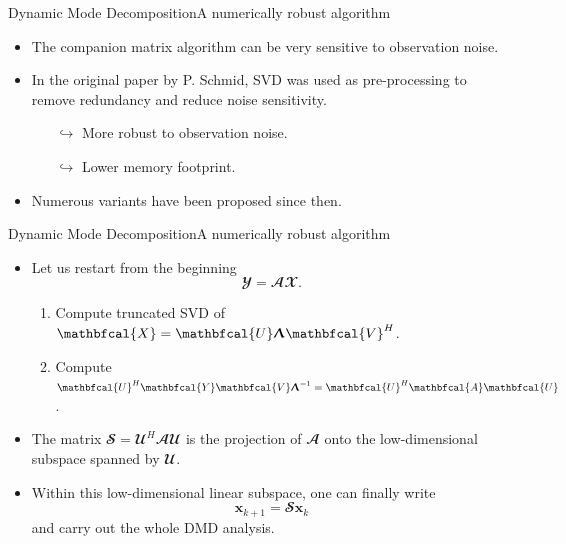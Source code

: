 \documentclass[usenames,dvipsnames,svgnames,10pt,aspectratio=169]{beamer}
\begin{document}
\begin{frame}[t, c]{Dynamic Mode Decomposition}{A numerically robust algorithm}
	\begin{itemize}
		\item The companion matrix algorithm can be very sensitive to observation noise.

		\bigskip

		\item In the original paper by P. Schmid, SVD was used as pre-processing to remove redundancy and reduce noise sensitivity.
		\begin{itemize}
			\item[$\hookrightarrow$] More robust to observation noise.
			\item[$\hookrightarrow$] Lower memory footprint.
		\end{itemize}

		\bigskip

		\item Numerous variants have been proposed since then.
	\end{itemize}

	\vspace{1cm}
\end{frame}

\begin{frame}[t, c]{Dynamic Mode Decomposition}{A numerically robust algorithm}
	\begin{itemize}
		\item Let us restart from the beginning
			$$\mathbfcal{Y} = \mathbfcal{A} \mathbfcal{X}.$$
			\begin{enumerate}
				\item Compute truncated SVD of $\mathbfcal{X} = \mathbfcal{U} \boldsymbol{\Uplambda} \mathbfcal{V}^H$.
				\item Compute $\mathbfcal{U}^H \mathbfcal{Y} \mathbfcal{V} \boldsymbol{\Uplambda}^{-1} = \mathbfcal{U}^H \mathbfcal{A} \mathbfcal{U}$.
			\end{enumerate}

			\bigskip

			\item The matrix $\mathbfcal{S} = \mathbfcal{U}^H \mathbfcal{A} \mathbfcal{U}$ is the projection of $\mathbfcal{A}$ onto the low-dimensional subspace spanned by $\mathbfcal{U}$.

			\bigskip

			\item Within this low-dimensional linear subspace, one can finally write
			$$\mathbf{x}_{k+1} = \mathbfcal{S} \mathbf{x}_{k}$$
			and carry out the whole DMD analysis.
	\end{itemize}

	\vspace{1cm}
\end{frame}
\end{document}
